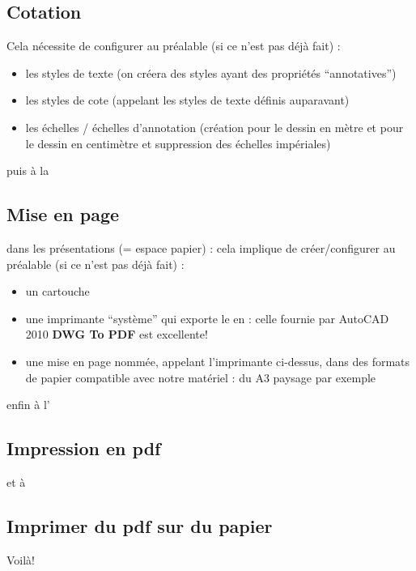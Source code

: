 \documentclass[a4paper,12pt,french]{sphinxmanual}
\begin{document}
\subsection{Cotation}
\label{init_su+acad/acad1:cotation}
Cela nécessite de configurer au préalable (si ce n'est pas déjà fait) :
\begin{itemize}
\item {} 
les styles de texte (on créera des styles ayant des propriétés ``annotatives'')

\item {} 
les styles de cote (appelant les styles de texte définis auparavant)

\item {} 
les échelles / échelles d'annotation (création pour le dessin en mètre et pour le dessin en centimètre et suppression des échelles impériales)

\end{itemize}

puis à la


\subsection{Mise en page}
\label{init_su+acad/acad1:mise-en-page}
dans les présentations (= espace papier) : cela implique de créer/configurer au préalable (si ce n'est pas déjà fait) :
\begin{itemize}
\item {} 
un cartouche

\item {} 
une imprimante ``système'' qui exporte le  en  : celle fournie par AutoCAD 2010 \textbf{DWG To PDF} est excellente!

\item {} 
une mise en page nommée, appelant l'imprimante ci-dessus, dans des formats de papier compatible avec notre matériel : du A3 paysage par exemple

\end{itemize}

enfin à l'


\subsection{Impression en pdf}
\label{init_su+acad/acad1:impression-en-pdf}
et à


\subsection{Imprimer du pdf sur du papier}
\label{init_su+acad/acad1:imprimer-du-pdf-sur-du-papier}
Voilà!
\end{document}

